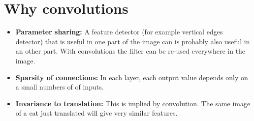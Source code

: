 \section{Why convolutions}
\begin{itemize}
    \item \textbf{Parameter sharing:} A feature detector (for example vertical edges detector) that is useful in one part of the image can is probably also useful in an other part. With convolutions the filter can be re-used everywhere in the image.
    \item \textbf{Sparsity of connections:} In each layer, each output value depends only on a small numbers of of inputs.
    \item \textbf{Invariance to translation:} This is implied by convolution. The same image of a cat just translated will give very similar features.
\end{itemize}




